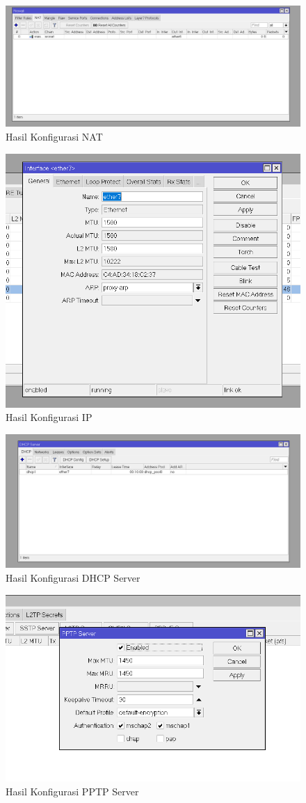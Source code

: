 \begin{figure}[h]
  \centering
  \includegraphics[width=0.5\linewidth]{dokum/Laptop 2/NAT.png}
  \caption{Hasil Konfigurasi NAT}
  \label{fig:nat}
\end{figure}

\begin{figure}[h]
  \centering
  \includegraphics[width=0.5\linewidth]{dokum/Laptop 2/Screenshot 2025-06-05 162848.png}
  \caption{Hasil Konfigurasi IP}
  \label{fig:ip}
\end{figure}

\begin{figure}[htbp]
  \centering
  \includegraphics[width=0.5\linewidth]{dokum/Laptop 2/DHCP Server.png}
  \caption{Hasil Konfigurasi DHCP Server}
  \label{fig:dhcp-server}
\end{figure}

\begin{figure}[htbp]
  \centering
  \includegraphics[width=0.5\linewidth]{dokum/Laptop 2/PPTPServer.png}
  \caption{Hasil Konfigurasi PPTP Server}
  \label{fig:PPTP-Server}
\end{figure}

